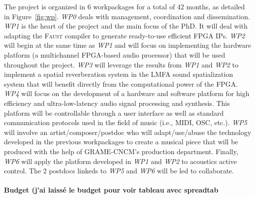\documentclass[a4paper,10pt]{article}
\newcommand{\F}{\textsc{Faust}}
\begin{document}
The project is organized in 6 workpackages for a total of 42 months, as detailed in Figure~\ref{fig:wp}. \textit{WP0} deals with management, coordination and dissemination. \textit{WP1} is the heart of the project and the main focus of the PhD. It will deal with adapting the \F{} compiler to generate ready-to-use efficient FPGA IPs. \textit{WP2} will begin at the same time as \textit{WP1} and will focus on implementing the hardware platform (a multichannel FPGA-based audio processor) that will be used throughout the project. \textit{WP3} will leverage the results from \textit{WP1} and \textit{WP2} to implement a spatial reverberation system in the LMFA sound spatialization system that will benefit directly from the computational power of the FPGA. %
\textit{WP4} will focus on the development of a hardware and software platform for high efficiency and ultra-low-latency audio signal processing and synthesis. This platform will be controllable through a user interface as well as standard communication protocols used in the field of music (i.e., MIDI, OSC, etc.).
\textit{WP5} will involve an artist/composer/postdoc who will adapt/use/abuse the technology developed in the previous workpackages to create a musical piece that will be produced with the help of GRAME-CNCM's production department. %
Finally, \textit{WP6} will apply the platform developed in \textit{WP1} and \textit{WP2} to acoustics active control. The 2 postdocs linkeds to \textit{WP5} and \textit{WP6} will be led to collaborate. 

\paragraph{Budget (j'ai laissé le budget pour voir tableau avec spreadtab}

\end{document}
